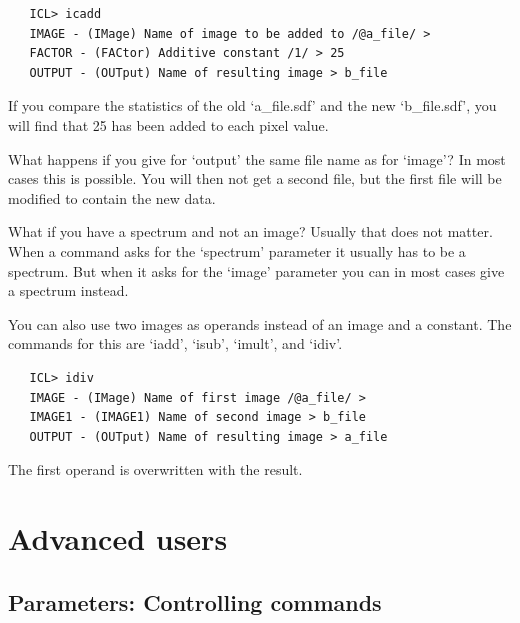 \begin{verbatim}
   ICL> icadd
   IMAGE - (IMage) Name of image to be added to /@a_file/ >
   FACTOR - (FACtor) Additive constant /1/ > 25
   OUTPUT - (OUTput) Name of resulting image > b_file
\end{verbatim}

   If you compare the statistics of the old `a\_file.sdf' and the new
   `b\_file.sdf', you will find that 25 has been added to each pixel
   value.

   What happens if you give for `output' the same file name as for
   `image'? In most cases this is possible. You will then not get a
   second file, but the first file will be modified to contain the new
   data.

   What if you have a spectrum and not an image? Usually that does not
   matter. When a command asks for the `spectrum' parameter it usually
   has to be a spectrum. But when it asks for the `image' parameter
   you can in most cases give a spectrum instead.

   You can also use two images as operands instead of an image and a
   constant. The commands for this are `iadd', `isub', `imult',
   and `idiv'.

\begin{verbatim}
   ICL> idiv
   IMAGE - (IMage) Name of first image /@a_file/ >
   IMAGE1 - (IMAGE1) Name of second image > b_file
   OUTPUT - (OUTput) Name of resulting image > a_file
\end{verbatim}

   The first operand is overwritten with the result.


\newpage %
\section{\label{advanced}Advanced users}


\subsection{\label{params}Parameters: Controlling commands}


